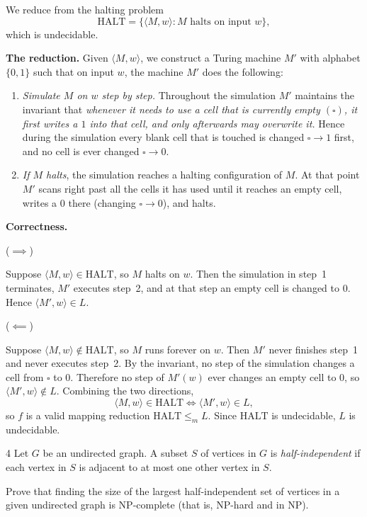 \documentclass[12pt]{article}
\begin{document}
\begin{solution}
    \bbni
    
    We reduce from the halting problem
    \[
    \mathrm{HALT} = \{\langle M, w\rangle : M \text{ halts on input } w\},
    \]
    which is undecidable. 

    \textbf{The reduction.} Given $\langle M, w\rangle$, we construct a Turing machine $M'$ with alphabet $\{0,1\}$ such that on input $w$, the machine $M'$ does the following: 
    \begin{enumerate} 
        \item \emph{Simulate $M$ on $w$ step by step.} Throughout the simulation $M'$ maintains the invariant that \emph{whenever it needs to use a cell that is currently empty $(\square)$, it first writes a $1$ into that cell, and only afterwards may overwrite it.} Hence during the simulation every blank cell that is touched is changed $\square \to 1$ first, and {no} cell is ever changed $\square \to 0$. 
        
        \item \emph{If $M$ halts}, the simulation reaches a halting configuration of $M$. At that point         $M'$ scans right past all the cells it has used until it reaches an empty cell, writes a         $0$ there (changing $\square \to 0$), and halts. 
    \end{enumerate} 
    \textbf{Correctness.}

    ($\implies$) 
    
    Suppose $\langle M, w\rangle \in \mathrm{HALT}$, so $M$ halts on $w$. Then the simulation in step~1 terminates, $M'$ executes step~2, and at that step an empty cell is changed to $0$. Hence $\langle M', w\rangle \in L$.

    ($\impliedby$) 
    
    Suppose $\langle M, w\rangle \notin \mathrm{HALT}$, so $M$ runs forever on $w$. Then $M'$ never finishes step~1 and never executes step~2. By the invariant, no step of the simulation changes a cell from $\square$ to $0$. Therefore no step of $M'(w)$ ever changes an empty cell to $0$, so $\langle M', w\rangle \notin L$.
    Combining the two directions,
    \[
    \langle M, w\rangle \in \mathrm{HALT} \iff \langle M', w\rangle \in L,
    \]
    so $f$ is a valid mapping reduction $\mathrm{HALT} \le_m L$. Since $\mathrm{HALT}$ is undecidable, $L$ is undecidable. 
\end{solution}

\newpage 

\begin{problem}{4}
    Let $G$ be an undirected graph. A subset $S$ of vertices in $G$ is \emph{half-independent} if each vertex in $S$ is adjacent to at most one other vertex in $S$.

    Prove that finding the size of the largest half-independent set of vertices in a given undirected graph is NP-complete (that is, NP-hard and in NP).
\end{problem}
\end{document}
